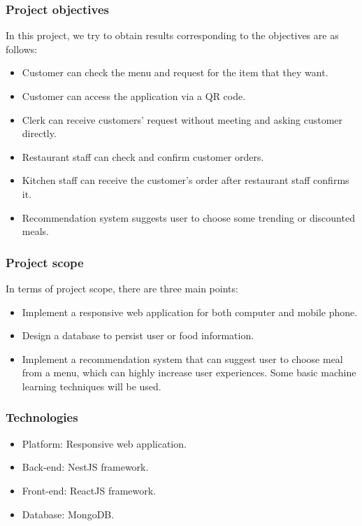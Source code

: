 \documentclass[11pt]{article}
\begin{document}
    \subsubsection*{Project objectives}
    In this project, we try to obtain results corresponding to the objectives are as follows:
    \begin{itemize}
        \item Customer can check the menu and request for the item that they want.
        \item Customer can access the application via a QR code.
        \item Clerk can receive customers' request without meeting and asking customer directly.
        \item Restaurant staff can check and confirm customer orders.
        \item Kitchen staff can receive the customer's order after restaurant staff confirms it.
        \item Recommendation system suggests user to choose some trending or discounted meals.
    \end{itemize}
    \subsubsection*{Project scope}
    In terms of project scope, there are three main points:
    \begin{itemize}
        \item Implement a responsive web application for both computer and mobile phone.
        \item Design a database to persist user or food information.
        \item Implement a recommendation system that can suggest user to choose meal from a menu, which can highly increase user experiences. Some basic machine learning techniques will be used.

    \end{itemize}
    \subsubsection*{Technologies}
    \begin{itemize}
        \item Platform: Responsive web application.
        \item Back-end: NestJS framework.
        \item Front-end: ReactJS framework.
        \item Database: MongoDB.
    \end{itemize}
\end{document}
